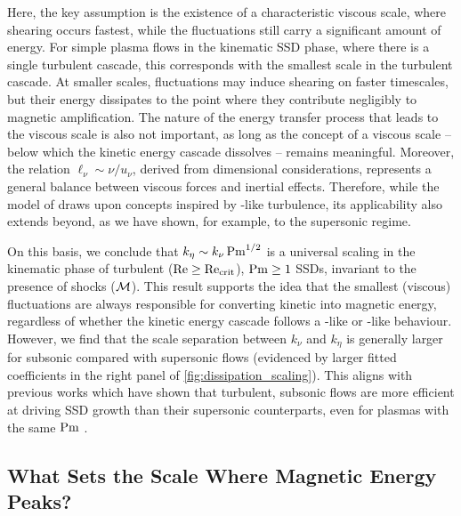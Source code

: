 Here, the key assumption is the existence of a characteristic viscous scale, where shearing occurs fastest, while the fluctuations still carry a significant amount of energy. For simple plasma flows in the kinematic SSD phase, where there is a single turbulent cascade, this corresponds with the smallest scale in the turbulent cascade. At smaller scales, fluctuations may induce shearing on faster timescales, but their energy dissipates to the point where they contribute negligibly to magnetic amplification. The nature of the energy transfer process that leads to the viscous scale is also not important, as long as the concept of a viscous scale -- below which the kinetic energy cascade dissolves -- remains meaningful. Moreover, the relation $\ell_\nu \sim \nu / u_\nu$, derived from dimensional considerations, represents a general balance between viscous forces and inertial effects. Therefore, while the model of \citet{schekochihin2002spectra} draws upon concepts inspired by \citet{kolmogorov1941dissipation}-like turbulence, its applicability also extends beyond, as we have shown, for example, to the supersonic regime.

On this basis, we conclude that \mbox{$k_\eta \sim k_\nu\, \mathrm{Pm}^{1/2}$} is a universal scaling in the kinematic phase of turbulent ($\mathrm{Re} \geq \mathrm{Re}_\mathrm{crit}$), $\mathrm{Pm} \geq 1$ SSDs, invariant to the presence of shocks (\ie $\mathcal{M}$). This result supports the idea that the smallest (viscous) fluctuations are always responsible for converting kinetic into magnetic energy, regardless of whether the kinetic energy cascade follows a \citet{burgers1948_turbulence_model}-like or \citet{kolmogorov1941dissipation}-like behaviour. However, we find that the scale separation between $k_\nu$ and $k_\eta$ is generally larger for subsonic compared with supersonic flows (evidenced by larger fitted coefficients in the right panel of \autoref{fig:dissipation_scaling}). This aligns with previous works which have shown that turbulent, subsonic flows are more efficient at driving SSD growth than their supersonic counterparts, even for plasmas with the same $\mathrm{Pm}$ \citep{schober2012magnetic}.

\subsection{What Sets the Scale Where Magnetic Energy Peaks?}
\label{sec:results:peak}

